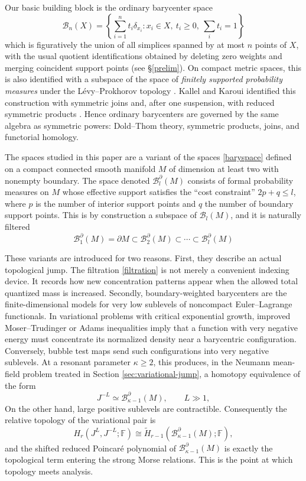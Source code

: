 \documentclass[11pt,a4paper]{article}
\numberwithin{equation}{section}
\theoremstyle{definition}
\theoremstyle{remark}
\newcommand{\F}{\mathbb{F}}
\newcommand{\pa}{\partial}
\newcommand{\BB}{\mathcal B}
\begin{document}
Our basic building block is the ordinary barycenter space
\begin{equation}\label{baryspace}
\BB_n(X)=\left\{\sum_{i=1}^n t_i\delta_{x_i}: x_i\in X,
\ t_i\ge0,\ \sum_i t_i=1\right\}
\end{equation}
which is figuratively the union of all simplices spanned by at most \(n\) points of \(X\), with the usual quotient identifications obtained by deleting zero weights and merging coincident support points (see \S\ref{prelim}). On compact metric spaces, this is also identified with a subspace of
 the space of \textit{finitely supported probability measures} under the Lévy--Prokhorov topology \cite{DJ, KW}. Kallel and Karoui identified this construction with symmetric joins and, after one suspension, with reduced symmetric products \cite{KallelKaroui2011}.  Hence ordinary barycenters are governed by the same algebra as symmetric powers: Dold--Thom theory, symmetric products, joins, and functorial homology.
 
 The spaces studied in this paper are a variant of the spaces \eqref{baryspace} defined on a compact connected smooth manifold $M$ of dimension at least two with nonempty boundary. The space denoted $\BB_l^\pa (M)$ consists of formal probability measures on \(M\) whose effective support satisfies the ``cost constraint'' \(2p+q\le l\), where \(p\) is the number of interior support points and \(q\) the number of boundary support points.
 This is by construction a subspace of $\BB_{l}(M)$, and it is naturally filtered
\begin{equation}\label{filtration}
\BB_1^{\pa}(M) = \partial M\subset \BB_2^{\pa}(M)\subset\cdots \subset \BB_l^\pa (M)
\end{equation}

These variants are introduced for two reasons. First, they describe an actual topological jump.  The filtration \eqref{filtration}
is not merely a convenient indexing device.  It records how new concentration patterns appear when the allowed total quantized mass is increased.  
Secondly, boundary-weighted barycenters are the finite-dimensional models for very low sublevels of noncompact Euler--Lagrange functionals.  In variational problems with critical exponential growth, improved Moser--Trudinger or Adams inequalities imply that a function with very negative energy must concentrate its normalized density near a barycentric configuration.  Conversely, bubble test maps send such configurations into very negative sublevels.  At a resonant parameter \(\kappa\ge2\), this produces, in the Neumann mean-field problem treated in Section \ref{sec:variational-jump}, a homotopy equivalence of the form
\[
J^{-L}\simeq \BB_{\kappa-1}^{\pa}(M),\qquad L\gg1,
\]
On the other hand, large positive sublevels are contractible.  Consequently the relative topology of the variational pair is
\[
H_r(J^L,J^{-L};\F)\cong \widetilde H_{r-1}(\BB_{\kappa-1}^{\pa}(M);\F),
\]
and the shifted reduced Poincar\'e polynomial of \(\BB_{\kappa-1}^{\pa}(M)\) is exactly the topological term entering the strong Morse relations.
This is the point at which topology meets analysis. 
\end{document}
